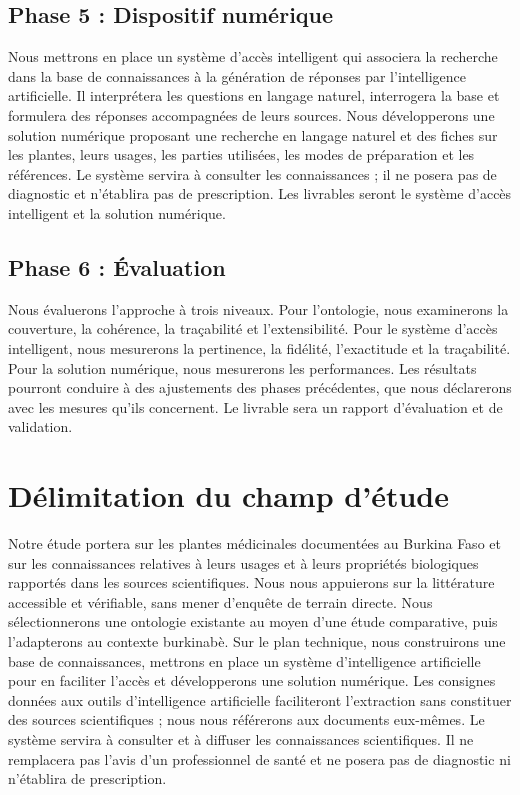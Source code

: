 \subsection*{Phase 5 : Dispositif numérique}

Nous mettrons en place un système d'accès intelligent qui associera la recherche dans la base de connaissances à la génération de réponses par l'intelligence artificielle. Il interprétera les questions en langage naturel, interrogera la base et formulera des réponses accompagnées de leurs sources. Nous développerons une solution numérique proposant une recherche en langage naturel et des fiches sur les plantes, leurs usages, les parties utilisées, les modes de préparation et les références. Le système servira à consulter les connaissances ; il ne posera pas de diagnostic et n'établira pas de prescription. Les livrables seront le système d'accès intelligent et la solution numérique.

\subsection*{Phase 6 : Évaluation}

Nous évaluerons l'approche à trois niveaux. Pour l'ontologie, nous examinerons la couverture, la cohérence, la traçabilité et l'extensibilité. Pour le système d'accès intelligent, nous mesurerons la pertinence, la fidélité, l'exactitude et la traçabilité. Pour la solution numérique, nous mesurerons les performances. Les résultats pourront conduire à des ajustements des phases précédentes, que nous déclarerons avec les mesures qu'ils concernent. Le livrable sera un rapport d'évaluation et de validation.

\section*{Délimitation du champ d'étude}

Notre étude portera sur les plantes médicinales documentées au Burkina Faso et sur les connaissances relatives à leurs usages et à leurs propriétés biologiques rapportés dans les sources scientifiques. Nous nous appuierons sur la littérature accessible et vérifiable, sans mener d'enquête de terrain directe. Nous sélectionnerons une ontologie existante au moyen d'une étude comparative, puis l'adapterons au contexte burkinabè. Sur le plan technique, nous construirons une base de connaissances, mettrons en place un système d'intelligence artificielle pour en faciliter l'accès et développerons une solution numérique. Les consignes données aux outils d'intelligence artificielle faciliteront l'extraction sans constituer des sources scientifiques ; nous nous référerons aux documents eux-mêmes. Le système servira à consulter et à diffuser les connaissances scientifiques. Il ne remplacera pas l'avis d'un professionnel de santé et ne posera pas de diagnostic ni n'établira de prescription.

